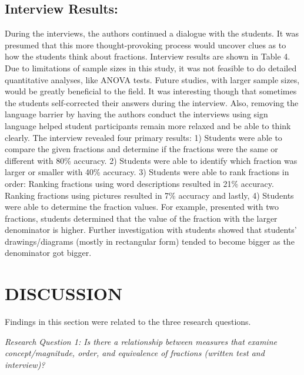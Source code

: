 \documentclass[11.5pt]{sig-alternate} %
\begin{document}
\begin{large}
\subsection*{Interview Results:}

During the interviews, the authors continued a dialogue with the students. It was presumed that this more thought-provoking process would uncover clues as to how the students think about fractions. Interview results are shown in Table 4. Due to limitations of sample sizes in this study, it was not feasible to do detailed quantitative analyses, like ANOVA tests. Future studies, with larger sample sizes, would be greatly beneficial to the field. It was interesting though that sometimes the students self-corrected their answers during the interview. Also, removing the language barrier by having the authors conduct the interviews using sign language helped student participants remain more relaxed and be able to think clearly. The interview revealed four primary results: 1) Students were able to compare the given fractions and determine if the fractions were the same or different with 80\% accuracy. 2) Students were able to identify which fraction was larger or smaller with 40\% accuracy. 3) Students were able to rank fractions in order: Ranking fractions using word descriptions resulted in 21\% accuracy. Ranking fractions using pictures resulted in 7\% accuracy and lastly, 4) Students were able to determine the fraction values. For example, presented with two fractions, students determined that the value of the fraction with the larger denominator is higher. Further investigation with students showed that students’ drawings/diagrams (mostly in rectangular form) tended to become bigger as the denominator got bigger.


\section*{DISCUSSION}

Findings in this section were related to the three research questions.

\textit{Research Question 1: Is there a relationship between measures that examine concept/magnitude, order, and equivalence of fractions (written test and interview)?}


\end{large}
\end{document}
